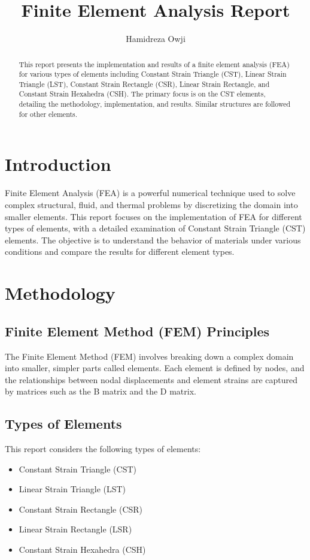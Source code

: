 \documentclass[12pt]{report}
\begin{document}
	
	\title{Finite Element Analysis Report}
	\author{Hamidreza Owji}
	\maketitle
	
	\begin{abstract}
		This report presents the implementation and results of a finite element analysis (FEA) for various types of elements including Constant Strain Triangle (CST), Linear Strain Triangle (LST), Constant Strain Rectangle (CSR), Linear Strain Rectangle, and Constant Strain Hexahedra (CSH). The primary focus is on the CST elements, detailing the methodology, implementation, and results. Similar structures are followed for other elements.
	\end{abstract}
	
	\tableofcontents
	\listoffigures
	\listoftables
	
	\chapter{Introduction}
	Finite Element Analysis (FEA) is a powerful numerical technique used to solve complex structural, fluid, and thermal problems by discretizing the domain into smaller elements. This report focuses on the implementation of FEA for different types of elements, with a detailed examination of Constant Strain Triangle (CST) elements. The objective is to understand the behavior of materials under various conditions and compare the results for different element types.
	
	\chapter{Methodology}
	\section{Finite Element Method (FEM) Principles}
	The Finite Element Method (FEM) involves breaking down a complex domain into smaller, simpler parts called elements. Each element is defined by nodes, and the relationships between nodal displacements and element strains are captured by matrices such as the B matrix and the D matrix.
	
	\section{Types of Elements}
	This report considers the following types of elements:
	\begin{itemize}
		\item Constant Strain Triangle (CST)
		\item Linear Strain Triangle (LST)
		\item Constant Strain Rectangle (CSR)
		\item Linear Strain Rectangle (LSR)
		\item Constant Strain Hexahedra (CSH)
	\end{itemize}
	
\end{document}
